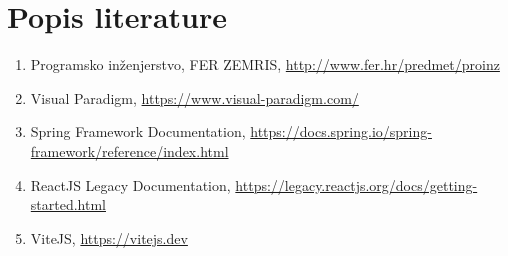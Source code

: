 \chapter*{Popis literature}
	 	
%	
		
		
		\begin{enumerate}
			
			
			\item  Programsko inženjerstvo, FER ZEMRIS, \url{http://www.fer.hr/predmet/proinz}
						
            \item  Visual Paradigm, \url{https://www.visual-paradigm.com/}

            \item  Spring Framework Documentation, \url{https://docs.spring.io/spring-framework/reference/index.html}

            \item  ReactJS Legacy Documentation, \url{https://legacy.reactjs.org/docs/getting-started.html}

			\item  ViteJS, \url{https://vitejs.dev}
		\end{enumerate}
		
		 